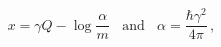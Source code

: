 \begin{equation}\label{alpha}
x=\gamma Q-\log\frac{\alpha}{m}~~~~\mbox{and}~~~~ 
\alpha =\frac{\hbar\gamma^2}{4\pi}\,,
\end{equation}

